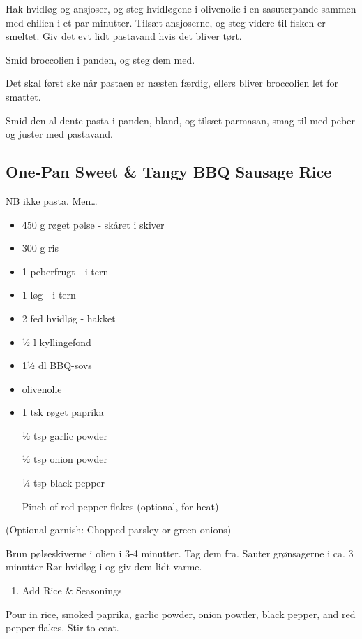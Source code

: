 \documentclass[
]{book}
\providecommand{\tightlist}{%
  \setlength{\itemsep}{0pt}\setlength{\parskip}{0pt}}
\begin{document}
Hak hvidløg og ansjoser, og steg hvidløgene i olivenolie i en sasuterpande sammen med chilien i et par minutter. Tilsæt ansjoserne, og steg videre til fisken er smeltet. Giv det evt lidt pastavand hvis det bliver tørt.

Smid broccolien i panden, og steg dem med.

Det skal først ske når pastaen er næsten færdig, ellers bliver broccolien let for smattet.

Smid den al dente pasta i panden, bland, og tilsæt parmasan, smag til med peber og juster med pastavand.

\subsection{One-Pan Sweet \& Tangy BBQ Sausage Rice}\label{one-pan-sweet-tangy-bbq-sausage-rice}

NB ikke pasta. Men\ldots{}

\begin{itemize}
\item
  450 g røget pølse - skåret i skiver
\item
  300 g ris
\item
  1 peberfrugt - i tern
\item
  1 løg - i tern
\item
  2 fed hvidløg - hakket
\item
  ½ l kyllingefond
\item
  1½ dl BBQ-sovs
\item
  olivenolie
\item
  1 tsk røget paprika

  ½ tsp garlic powder

  ½ tsp onion powder

  ¼ tsp black pepper

  Pinch of red pepper flakes (optional, for heat)
\end{itemize}

(Optional garnish: Chopped parsley or green onions)

Brun pølseskiverne i olien i 3-4 minutter. Tag dem fra.
Sauter grønsagerne i ca. 3 minutter
Rør hvidløg i og giv dem lidt varme.

\begin{enumerate}
\def\labelenumi{\arabic{enumi}.}
\setcounter{enumi}{2}
\tightlist
\item
  Add Rice \& Seasonings
\end{enumerate}

Pour in rice, smoked paprika, garlic powder, onion powder, black pepper, and red pepper flakes. Stir to coat.
\end{document}
